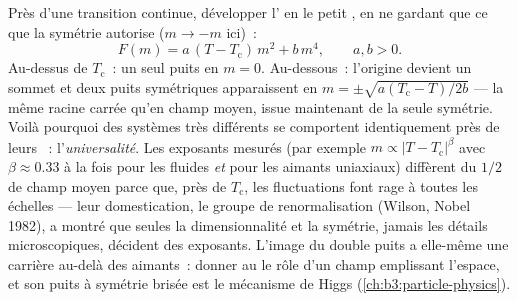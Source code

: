 \begin{proposition}\label{prop:b3:phase-transitions:landau}
Près d'une transition continue, développer l' en le
petit , en ne gardant que ce que la symétrie
autorise ($m \to -m$ ici)~:
\[
F(m) = a\,(T - T_{\text{c}})\,m^2 + b\,m^4 , \qquad a, b > 0 .
\]
Au-dessus de $T_{\text{c}}$~: un seul puits en $m = 0$. Au-dessous~:
l'origine devient un sommet et deux puits symétriques apparaissent
en $m = \pm
\sqrt{a(T_{\text{c}} - T)/2b}$ --- la même racine carrée qu'en champ
moyen, issue maintenant de la seule symétrie. Voilà pourquoi des
systèmes très différents se comportent identiquement près de leurs
~: l'\emph{universalité}. Les exposants mesurés (par
exemple $m \propto |T -
T_{\text{c}}|^\beta$ avec $\beta \approx 0.33$ à la fois pour les
fluides \emph{et} pour les aimants uniaxiaux) diffèrent du $1/2$ de
champ moyen parce que, près de $T_{\text{c}}$, les fluctuations font
rage à toutes les échelles --- leur domestication, le groupe de
renormalisation (Wilson, Nobel 1982), a montré que seules la
dimensionnalité et la symétrie, jamais les détails microscopiques,
décident des exposants. L'image du double puits a elle-même une
carrière au-delà des aimants~: donner au  le rôle
d'un champ emplissant l'espace, et son puits à symétrie brisée est
le mécanisme de Higgs (\cref{ch:b3:particle-physics}).
\end{proposition}
\admitted

